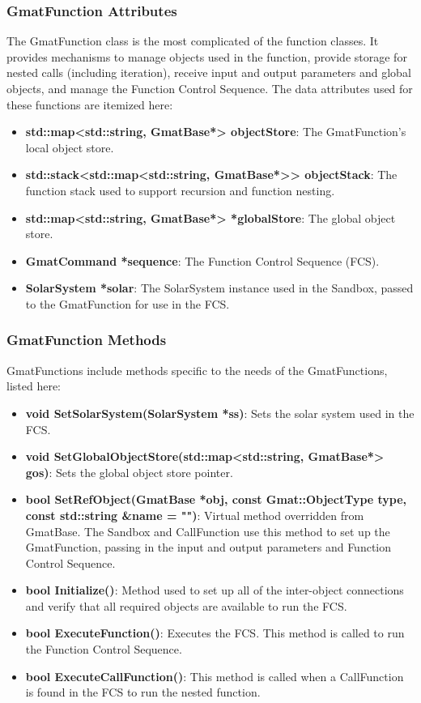 \subsubsection{GmatFunction Attributes}

The GmatFunction class is the most complicated of the function classes.  It provides mechanisms to
manage objects used in the function, provide storage for nested calls (including iteration),
receive input and output parameters and global objects, and manage the Function Control Sequence. 
The data attributes used for these functions are itemized here:

\begin{itemize}
\item \textbf{std::map<std::string, GmatBase*> objectStore}:  The GmatFunction's local object store.
\item \textbf{std::stack<std::map<std::string, GmatBase*>> objectStack}:  The function stack used
to support recursion and function nesting.
\item \textbf{std::map<std::string, GmatBase*> *globalStore}:  The global object store.
\item \textbf{GmatCommand *sequence}: The Function Control Sequence (FCS).
\item \textbf{SolarSystem *solar}:  The SolarSystem instance used in the Sandbox, passed to the
GmatFunction for use in the FCS.
\end{itemize}

\subsubsection{GmatFunction Methods}

GmatFunctions include methods specific to the needs of the GmatFunctions, listed here:

\begin{itemize}
\item \textbf{void SetSolarSystem(SolarSystem *ss)}: Sets the solar system used in the FCS.
\item \textbf{void SetGlobalObjectStore(std::map<std::string, GmatBase*> gos)}: Sets the global
object store pointer.
\item \textbf{bool SetRefObject(GmatBase *obj, const Gmat::ObjectType type, const std::string \&name
= "")}: Virtual method overridden from GmatBase.  The Sandbox and CallFunction use this method to
set up the GmatFunction, passing in the input and output parameters and Function Control Sequence.
\item \textbf{bool Initialize()}: Method used to set up all of the inter-object connections and
verify that all required objects are available to run the FCS.
\item \textbf{bool ExecuteFunction()}: Executes the FCS.  This method is called to run the Function
Control Sequence.
\item \textbf{bool ExecuteCallFunction()}:  This method is called when a CallFunction is found in
the FCS to run the nested function.
\end{itemize}

